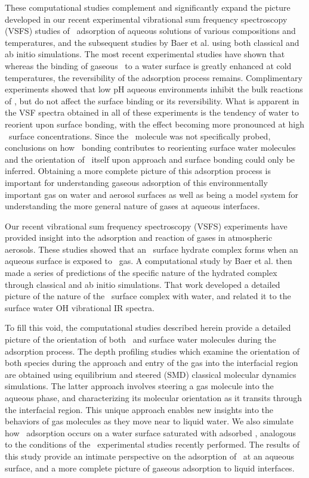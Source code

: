 These computational studies complement and significantly expand the picture developed in our recent experimental vibrational sum frequency spectroscopy (VSFS) studies of \suldiox~adsorption of aqueous solutions of various compositions and temperatures, and the subsequent studies by Baer et al.\cite{Baer2010} using both classical and ab initio simulations.  The most recent experimental studies have shown that whereas the binding of gaseous \suldiox~to a water surface is greatly enhanced at cold temperatures, the reversibility of the adsorption process remains.  Complimentary experiments showed that low pH aqueous environments inhibit the bulk reactions of \suldiox, but do not affect the surface binding or its reversibility.  What is apparent in the VSF spectra obtained in all of these experiments is the tendency of water to reorient upon surface bonding, with the effect becoming more pronounced at high \suldiox~surface concentrations. Since the \suldiox~molecule was not specifically probed, conclusions on how \suldiox~bonding contributes to reorienting surface water molecules and the orientation of \suldiox~itself upon approach and surface bonding could only be inferred. Obtaining a more complete picture of this adsorption process is important for understanding gaseous adsorption of this environmentally important gas on water and aerosol surfaces as well as being a model system for understanding the more general nature of gases at aqueous interfaces.

Our recent vibrational sum frequency spectroscopy (VSFS) experiments have provided insight into the adsorption and reaction of gases in atmospheric aerosols.\cite{Tarbuck2005,Tarbuck2006} These studies showed that an \suldiox~surface hydrate complex forms when an aqueous surface is exposed to \suldiox~gas. A computational study by Baer et al.\cite{Baer2010} then made a series of predictions of the specific nature of the hydrated complex through classical and ab initio simulations. That work developed a detailed picture of the nature of the \suldiox~surface complex with water, and related it to the surface water OH vibrational IR spectra.

To fill this void, the computational studies described herein provide a detailed picture of the orientation of both \suldiox~and surface water molecules during the adsorption process.  The depth profiling studies which examine the orientation of both species during the approach and entry of the gas into the interfacial region are obtained using equilibrium and steered (SMD) classical molecular dynamics simulations. The latter approach involves steering a gas molecule into the aqueous phase, and characterizing its molecular orientation as it transits through the interfacial region.  This unique approach enables new insights into the behaviors of gas molecules as they move near to liquid water. We also simulate how \suldiox~adsorption occurs on a water surface saturated with adsorbed \suldiox, analogous to the conditions of the \suldiox~experimental studies recently performed.\cite{Ota2011} The results of this study provide an intimate perspective on the adsorption of \suldiox~at an aqueous surface, and a more complete picture of gaseous adsorption to liquid interfaces.
